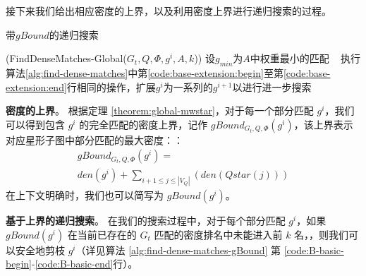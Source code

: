 接下来我们给出相应密度的上界，以及利用密度上界进行递归搜索的过程。


\begin{algorithm}[h!]
    \small
    \caption{带$gBound$的递归搜索}
    \label{alg:find-dense-matches-gBound}
    \iFunc(FindDenseMatches-Global{(}$G_t, Q, \Phi, g^i, A, k${)})
    {
    设$g_{min}$为$A$中权重最小的匹配 \
    执行算法\ref{alg:find-dense-matches}中第\ref{code:base-extension:begin}至第\ref{code:base-extension:end}行相同的操作，扩展$g^i$为一系列的$g^{i+1}$以进行进一步搜索 \\
    \Return
    }
\end{algorithm}

\textbf{密度的上界}。 根据定理 \ref{theorem:global-mwstar}，对于每一个部分匹配 $g^i$，我们可以得到包含 $g^i$ 的完全匹配的密度上界，记作 $gBound_{G_t, Q, \Phi}(g^i)$，该上界表示对应星形子图中部分匹配的最大密度：：
  \begin{equation*}
	\begin{multlined}
	 gBound_{G_t, Q, \Phi}(g^i) =  \\ den(g^i) + \sum\nolimits_{i+1\leq j\leq |V_Q|} \left(den(Qstar(j))\right)
	\end{multlined}
  \end{equation*}
  在上下文明确时，我们也可以简写为 $gBound(g^i)$。
  
  \textbf{基于上界的递归搜索}。 在我们的搜索过程中，对于每个部分匹配 $g^i$，如果 $gBound(g^i)$ 在当前已存在的 $G_t$ 匹配的密度排名中未能进入前 $k$ 名，，则我们可以安全地剪枝 $g^i$（详见算法 \ref{alg:find-dense-matches-gBound}  第 \ref{code:B-basic-begin}-\ref{code:B-basic-end}行）。
  
